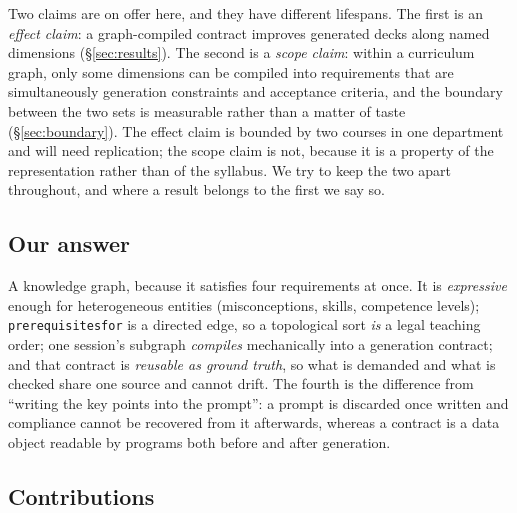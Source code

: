 \documentclass[review,12pt]{elsarticle}
\renewcommand{\_}{\kgunderscore\allowbreak}
\newcommand{\id}[1]{\texttt{#1}}
\begin{document}
Two claims are on offer here, and they have different lifespans. The first is an
\emph{effect claim}: a graph-compiled contract improves generated decks along
named dimensions (\S\ref{sec:results}). The second is a \emph{scope claim}: within
a curriculum graph, only some dimensions can be compiled into requirements that
are simultaneously generation constraints and acceptance criteria, and the
boundary between the two sets is measurable rather than a matter of taste
(\S\ref{sec:boundary}). The effect claim is bounded by two courses in one department and
will need replication; the scope claim is not, because it is a property of the
representation rather than of the syllabus. We try to keep the two apart
throughout, and where a result belongs to the first we say so.



\subsection{Our answer}
\label{sec:answer}

A knowledge graph, because it satisfies four requirements at once. It is
\emph{expressive} enough for heterogeneous entities (misconceptions, skills,
competence levels); \id{prerequisites\_for} is a directed edge, so a topological
sort \emph{is} a legal teaching order; one session's subgraph \emph{compiles}
mechanically into a generation contract; and that contract is \emph{reusable as
ground truth}, so what is demanded and what is checked share one source and
cannot drift. The fourth is the difference from ``writing the key points into the
prompt'': a prompt is discarded once written and compliance cannot be recovered
from it afterwards, whereas a contract is a data object readable by programs both
before and after generation.

\subsection{Contributions}
\end{document}
